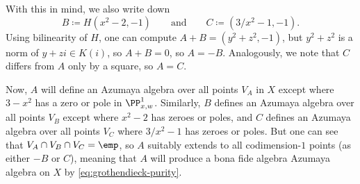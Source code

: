 \documentclass[../notes.tex]{subfiles}
\begin{document}
\begin{itemize}
	With this in mind, we also write down
	\[B\coloneqq H\left(x^2-2,-1\right)\qquad\text{and}\qquad C\coloneqq\left(3/x^2-1,-1\right).\]
	Using bilinearity of $H$, one can compute $A+B=\left(y^2+z^2,-1\right)$, but $y^2+z^2$ is a norm of $y+zi\in K(i)$, so $A+B=0$, so $A=-B$. Analogously, we note that $C$ differs from $A$ only by a square, so $A=C$.

	Now, $A$ will define an Azumaya algebra over all points $V_A$ in $X$ except where $3-x^2$ has a zero or pole in $\PP^1_{x,w}$. Similarly, $B$ defines an Azumaya algebra over all points $V_B$ except where $x^2-2$ has zeroes or poles, and $C$ defines an Azumaya algebra over all points $V_C$ where $3/x^2-1$ has zeroes or poles. But one can see that $V_A\cap V_B\cap V_C=\emp$, so $A$ suitably extends to all codimension-$1$ points (as either $-B$ or $C$), meaning that $A$ will produce a bona fide algebra Azumaya algebra on $X$ by \eqref{eq:grothendieck-purity}.
\end{itemize}
\end{document}
